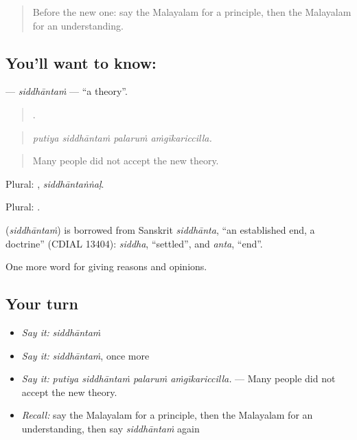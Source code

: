 \label{lesson:ML-C414-siddhantam}



\begin{quote}
Before the new one: say the Malayalam for a principle, then the Malayalam for an understanding.
\end{quote}

\subsection*{You'll want to know: }
\textbf{} — \emph{siddhāntaṁ} — \textquotedblleft{}a theory\textquotedblright{}.

\begin{quote}
   .
\end{quote}

\begin{quote}
\emph{putiya siddhāntaṁ palaruṁ aṁgīkariccilla.}
\end{quote}

\begin{quote}
Many people did not accept the new theory.
\end{quote}

Plural: , \emph{siddhāntaṅṅaḷ}.

Plural: .

\begin{cousinweb}
\textbf{} (\emph{siddhāntaṁ}) is borrowed from Sanskrit \emph{siddhānta}, \textquotedblleft{}an established end, a doctrine\textquotedblright{} (CDIAL 13404): \emph{siddha}, \textquotedblleft{}settled\textquotedblright{}, and \emph{anta}, \textquotedblleft{}end\textquotedblright{}.
\end{cousinweb}

\begin{grammarlens}[title={What you've built}]
One more word for giving reasons and opinions.
\end{grammarlens}

\subsection*{Your turn}
\begin{itemize}
\raggedright
  \item \emph{Say it:} \emph{siddhāntaṁ}
  \item \emph{Say it:} \emph{siddhāntaṁ}, once more
  \item \emph{Say it:} \emph{putiya siddhāntaṁ palaruṁ aṁgīkariccilla.} — Many people did not accept the new theory.
  \item \emph{Recall:} say the Malayalam for a principle, then the Malayalam for an understanding, then say \emph{siddhāntaṁ} again
\end{itemize}

